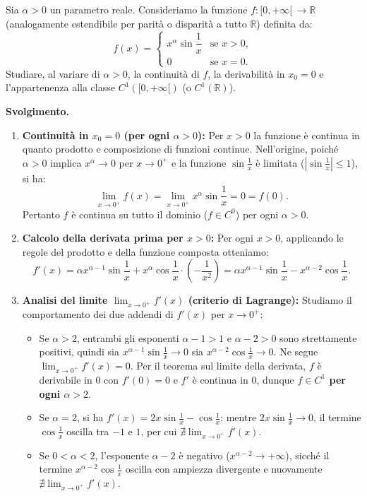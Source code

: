 \begin{esbox}[Esercizio svolto — Studio completo di $f(x) = x^\alpha \sin\frac{1}{x}$ per $\alpha > 0$]
Sia $\alpha > 0$ un parametro reale. Consideriamo la funzione $f \colon [0, +\infty[\, \to \mathbb{R}$ (analogamente estendibile per parità o disparità a tutto $\mathbb{R}$) definita da:
\[
    f(x) = \begin{cases} x^\alpha \sin\dfrac{1}{x} & \text{se } x > 0, \\[6pt] 0 & \text{se } x = 0. \end{cases}
\]
Studiare, al variare di $\alpha > 0$, la continuità di $f$, la derivabilità in $x_0 = 0$ e l'appartenenza alla classe $C^1([0, +\infty[)$ (o $C^1(\mathbb{R})$).

\medskip
\noindent\textbf{Svolgimento.}
\begin{enumerate}
    \item \textbf{Continuità in $x_0 = 0$ (per ogni $\alpha > 0$):} Per $x > 0$ la funzione è continua in quanto prodotto e composizione di funzioni continue. Nell'origine, poiché $\alpha > 0$ implica $x^\alpha \to 0$ per $x \to 0^+$ e la funzione $\sin\frac{1}{x}$ è limitata ($|\sin\frac{1}{x}| \le 1$), si ha:
    \[
        \lim_{x \to 0^+} f(x) = \lim_{x \to 0^+} x^\alpha \sin\frac{1}{x} = 0 = f(0).
    \]
    Pertanto $f$ è continua su tutto il dominio ($f \in C^0$) per ogni $\alpha > 0$.

    \item \textbf{Calcolo della derivata prima per $x > 0$:} Per ogni $x > 0$, applicando le regole del prodotto e della funzione composta otteniamo:
    \[
        f'(x) = \alpha x^{\alpha - 1} \sin\frac{1}{x} + x^\alpha \cos\frac{1}{x} \cdot \left(-\frac{1}{x^2}\right) = \alpha x^{\alpha - 1} \sin\frac{1}{x} - x^{\alpha - 2} \cos\frac{1}{x}.
    \]

    \item \textbf{Analisi del limite $\lim_{x \to 0^+} f'(x)$ (criterio di Lagrange):} Studiamo il comportamento dei due addendi di $f'(x)$ per $x \to 0^+$:
    \begin{itemize}
        \item Se $\alpha > 2$, entrambi gli esponenti $\alpha - 1 > 1$ e $\alpha - 2 > 0$ sono strettamente positivi, quindi sia $x^{\alpha - 1} \sin\frac{1}{x} \to 0$ sia $x^{\alpha - 2} \cos\frac{1}{x} \to 0$. Ne segue $\lim_{x \to 0^+} f'(x) = 0$. Per il teorema sul limite della derivata, $f$ è derivabile in $0$ con $f'(0) = 0$ e $f'$ è continua in $0$, dunque \textbf{$f \in C^1$ per ogni $\alpha > 2$}.
        \item Se $\alpha = 2$, si ha $f'(x) = 2x \sin\frac{1}{x} - \cos\frac{1}{x}$: mentre $2x\sin\frac{1}{x} \to 0$, il termine $\cos\frac{1}{x}$ oscilla tra $-1$ e $1$, per cui \textbf{$\nexists \lim_{x \to 0^+} f'(x)$}.
        \item Se $0 < \alpha < 2$, l'esponente $\alpha - 2$ è negativo ($x^{\alpha - 2} \to +\infty$), sicché il termine $x^{\alpha - 2} \cos\frac{1}{x}$ oscilla con ampiezza divergente e nuovamente \textbf{$\nexists \lim_{x \to 0^+} f'(x)$}.
    \end{itemize}


\end{enumerate}
\end{esbox}
